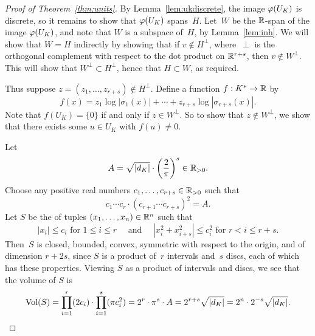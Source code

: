 \begin{proof}[Proof of Theorem~\ref{thm:units}]
	By Lemma~\ref{lem:ukdiscrete}, the image $\varphi(U_K)$ is discrete,
	so it remains to show that $\varphi(U_K)$ spans~$H$.
	Let~$W$ be the $\mathbb{R}$-span of the image $\varphi(U_K)$, and note that $W$ is a
	subspace of~$H$, by Lemma~\ref{lem:inh}. 
	We will show that $W=H$ indirectly by showing that if $v\not \in H^{\perp}$,
	where~$\perp$ is the orthogonal complement with respect to the dot product
	on $\mathbb{R}^{r+s}$, then $v\not \in W^{\perp}$.
	This will show that $W^{\perp}\subset H^{\perp}$, hence that $H\subset W$,
	as required.
	
	Thus suppose $z=(z_1,\ldots,z_{r+s})\not\in H^{\perp}$.
	Define a function $f:K^*\to \mathbb{R}$ by
	\begin{equation}\label{eqn:f}
		f(x) = z_1\log|\sigma_1(x)| + \cdots + z_{r+s}\log|\sigma_{r+s}(x)|.
	\end{equation}
	Note that $f(U_K)=\{0\}$ if and only if $z\in W^{\perp}$. So to show
	that $z\not\in W^{\perp}$, we show that there exists some $u\in U_K$
	with $f(u)\neq 0$.
	
	Let
	$$
		A=\sqrt{|d_K|} \cdot \left( \frac{2}{\pi}\right)^s \in \mathbb{R}_{>0}.
	$$
	Choose any positive real numbers $c_1,\ldots, c_{r+s} \in \mathbb{R}_{>0}$ such that
	$$
		c_1\cdots c_r\cdot (c_{r+1}\cdots c_{r+s})^2 = A.
	$$
	Let $S$ be the of tuples $(x_1,\dots,x_n) \in \mathbb{R}^n$ such that
	$$
		 |x_i|\leq c_i\text{ for } 1\leq i \leq r
		 \quad\text{ and }\quad
		 |x_i^2 + x_{i+s}^2| \leq c_i^2 \text{ for } r<i\leq r+s.
	$$
	Then~$S$ is closed, bounded, convex, symmetric with respect to the
	origin, and of dimension $r+2s$, since $S$ is a product of~$r$ intervals
	and~$s$ discs, each of which has these properties. Viewing $S$ as a product
	of intervals and discs, we see that the volume of $S$ is
	$$
		\operatorname{Vol}(S)
		= \prod_{i=1}^r (2c_i) \cdot \prod_{i=1}^s (\pi c_i^2)
		= 2^r\cdot \pi^s \cdot A
		= 2^{r+s}\sqrt{|d_K|}
		= 2^n \cdot 2^{-s}\sqrt{|d_K|}.
	$$
	

\end{proof}
